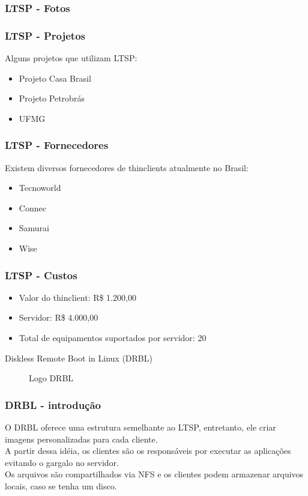 \documentclass[utf8,9pt]{beamer}
\begin{document}
	  \begin{frame}
		  \frametitle{LTSP - Fotos}


	  \end{frame}

	  \begin{frame}
		  \frametitle{LTSP - Projetos}
		  Alguns projetos que utilizam LTSP:
		  \begin{itemize}
			  \item Projeto Casa Brasil
			  \item Projeto Petrobrás
			  \item UFMG
		  \end{itemize}
	  \end{frame}


	  \begin{frame}
		  \frametitle{LTSP - Fornecedores}
		  Existem diversos fornecedores de thinclients atualmente no Brasil:
		  \begin{itemize}
			  \item Tecnoworld
			  \item Connec
			  \item Samurai
			  \item Wise 
		  \end{itemize}
	  \end{frame}


	  \begin{frame}
		  \frametitle{LTSP - Custos}
		  \begin{itemize}
			  \item Valor do thinclient: R\$ 1.200,00
			  \item Servidor: R\$ 4.000,00
			  \item Total de equipamentos suportados por servidor: 20
		  \end{itemize}
	  \end{frame}

	  \begin{frame}
		  \begin{center}
			  \Huge{Diskless Remote Boot in Linux (DRBL)}
			  \begin{figure}
				  \caption{Logo DRBL}
			  \end{figure}
		  \end{center}
	  \end{frame}

	  \begin{frame}
		  \frametitle{DRBL - introdução}
		  O DRBL oferece uma estrutura semelhante ao LTSP, entretanto, ele criar imagens personalizadas para cada cliente. \\
		  A partir dessa idéia, os clientes são os responsáveis por executar as aplicações evitando o gargalo no servidor. \\
		  Os arquivos são compartilhados via NFS e os clientes podem armazenar arquivos locais, caso se tenha um disco.
	  \end{frame}
\end{document}
